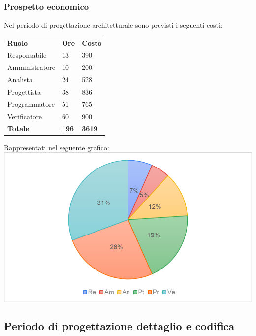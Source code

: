 \subsubsection{Prospetto economico}
Nel periodo di progettazione architetturale sono previsti i seguenti costi:
\begin{longtable} {
		>{}p{32mm}
		>{}p{20mm}
		>{}p{20mm}
	}
	\rowcolor{gray!50}
	
	\textbf{Ruolo} & \textbf{Ore} & \textbf{Costo} \TBstrut \\
	Responsabile & 13 & 390 \TBstrut \\
	Amministratore & 10 & 200 \TBstrut \\
	Analista & 24 & 528 \TBstrut \\
	Progettista & 38 & 836 \TBstrut \\
	Programmatore & 51 & 765 \TBstrut \\
	Verificatore & 60 & 900 \TBstrut \\
	\textbf{Totale} & \textbf{196}& \textbf{3619} \TBstrut \\		
\end{longtable}	
Rappresentati nel seguente grafico: \\
\includegraphics[width=\linewidth]{./img/Grafici/4.png}

\subsection{Periodo di progettazione dettaglio e codifica}
